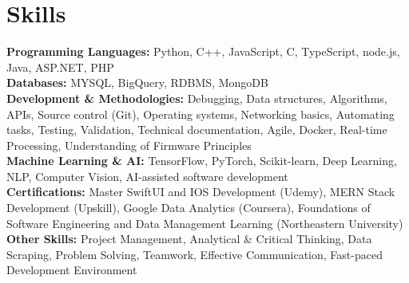 \documentclass[a4paper,10pt]{article}
\begin{document}
\section*{Skills}
\textbf{Programming Languages:} Python, C++, JavaScript, C, TypeScript, node.js, Java, ASP.NET, PHP \\
\textbf{Databases:} MYSQL, BigQuery, RDBMS, MongoDB \\
\textbf{Development & Methodologies:} Debugging, Data structures, Algorithms, APIs, Source control (Git), Operating systems, Networking basics, Automating tasks, Testing, Validation, Technical documentation, Agile, Docker, Real-time Processing, Understanding of Firmware Principles \\
\textbf{Machine Learning & AI:} TensorFlow, PyTorch, Scikit-learn, Deep Learning, NLP, Computer Vision, AI-assisted software development \\
\textbf{Certifications:} Master SwiftUI and IOS Development (Udemy), MERN Stack Development (Upskill), Google Data Analytics (Coursera), Foundations of Software Engineering and Data Management Learning (Northeastern University) \\
\textbf{Other Skills:} Project Management, Analytical \& Critical Thinking, Data Scraping, Problem Solving, Teamwork, Effective Communication, Fast-paced Development Environment \\

\vspace{-4mm}
\end{document}
